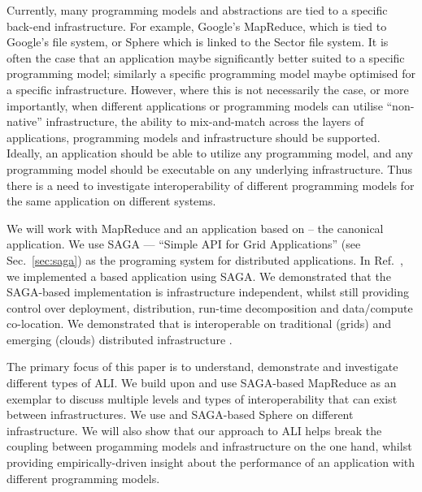 \documentclass[3p,twocolumn]{elsarticle}
\begin{document}
Currently, many programming models and abstractions are tied to a
specific back-end infrastructure.  For example, Google's MapReduce,
which is tied to Google's file system, or Sphere\cite{sectorsphere09}
which is linked to the Sector file system.  It is often the case that
an application maybe significantly better suited to a specific
programming model; similarly a specific programming model maybe
optimised for a specific infrastructure. However, where this is not
necessarily the case, or more importantly, when different
applications or programming models can utilise ``non-native''
infrastructure, the ability to mix-and-match across the layers of
applications, programming models and infrastructure should be
supported.  Ideally, an application should be able to utilize any
programming model, and any programming model should be executable on
any underlying infrastructure.  Thus there is a need to investigate
interoperability of different programming models for the same
application on different systems.

We will work with MapReduce and an application based on \mr -- the
canonical \wc application.  We use SAGA --- “Simple API for Grid
Applications'' (see Sec.~\ref{sec:saga}) as the programing system for
distributed applications.  In Ref.~\cite{saga_ccgrid09}, we
implemented a \mr based \wc application using SAGA.  We demonstrated
that the SAGA-based implementation is infrastructure independent,
whilst still providing control over deployment, distribution, run-time
decomposition and data/compute co-location.  We demonstrated that
\sagamapreduce is interoperable on traditional (grids) and emerging
(clouds) distributed infrastructure .

The primary focus of this paper is to understand, demonstrate and
investigate different types of ALI. We build upon and use SAGA-based
MapReduce as an exemplar to discuss multiple levels and types of
interoperability that can exist between infrastructures. We use
\sagamapreduce and SAGA-based Sphere on different infrastructure. We
will also show that our approach to ALI helps break the coupling
between progamming models and infrastructure on the one hand, whilst
providing empirically-driven insight about the performance of an
application with different programming models.
\end{document}
